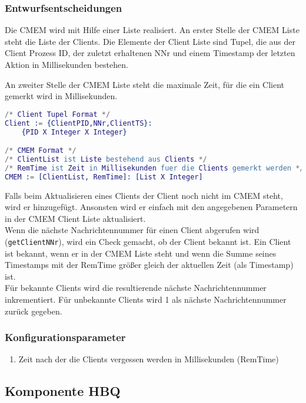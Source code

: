 \documentclass{article}
\begin{document}
\subsubsection{Entwurfsentscheidungen}
Die CMEM wird mit Hilfe einer Liste realisiert. An erster Stelle der CMEM Liste steht die Liste der Clients. Die Elemente der Client Liste sind Tupel, die aus der Client Prozess ID, der zuletzt erhaltenen NNr und einem Timestamp der letzten Aktion in Millisekunden bestehen.

An zweiter Stelle der CMEM Liste steht die maximale Zeit, für die ein Client gemerkt wird in Millisekunden.

\begin{lstlisting}[language=erlang]
/* Client Tupel Format */
Client := {ClientPID,NNr,ClientTS}:
    {PID X Integer X Integer}

/* CMEM Format */
/* ClientList ist Liste bestehend aus Clients */
/* RemTime ist Zeit in Millisekunden fuer die Clients gemerkt werden */
CMEM := [ClientList, RemTime]: [List X Integer]
\end{lstlisting}

Falls beim Aktualisieren eines Clients der Client noch nicht im CMEM steht, wird er hinzugefügt.
Ansonsten wird er einfach mit den angegebenen Parametern in der CMEM Client Liste aktualisiert.\\

Wenn die nächste Nachrichtennummer für einen Client abgerufen wird (\texttt{getClientNNr}), wird ein Check gemacht, ob der Client bekannt ist.
Ein Client ist bekannt, wenn er in der CMEM Liste steht und wenn die Summe seines Timestamps mit der RemTime größer gleich der aktuellen Zeit (als Timestamp) ist.\\

Für bekannte Clients wird die resultierende nächste Nachrichtennummer inkrementiert. Für unbekannte Clients wird 1 als nächste Nachrichtennummer zurück gegeben.

\subsubsection{Konfigurationsparameter}
\begin{enumerate}
    \item{Zeit nach der die Clients vergessen werden in Millisekunden (RemTime)}
\end{enumerate}

\newpage
			
\subsection{Komponente HBQ}
\end{document}
